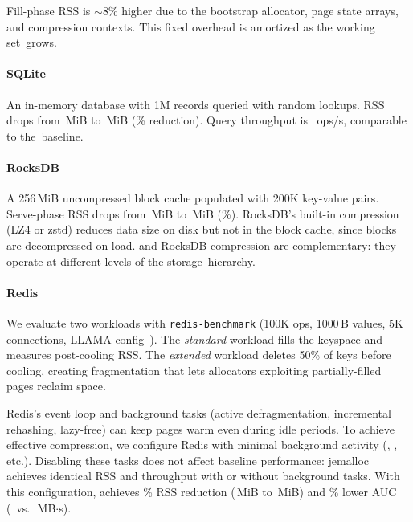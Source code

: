Fill-phase RSS is $\sim$8\% higher due to the
bootstrap allocator, page state arrays, and compression contexts.
This fixed overhead is amortized as the working set~grows.

\paragraph{SQLite}
An in-memory database with 1M records queried with random lookups.
RSS drops from \ablSqliteBaselineServeRss\,MiB to \ablSqliteDefaultServeRss\,MiB (\ablSqliteDefaultRssRedInt\% reduction).
Query throughput is \ablSqliteDefaultOps~ops/s, comparable to the~baseline.

\paragraph{RocksDB}
A 256\,MiB uncompressed block cache populated with 200K key-value
pairs.  Serve-phase RSS drops from \ablRocksdbBaselineServeRss\,MiB to \ablRocksdbDefaultServeRss\,MiB (\ablRocksdbDefaultRssRedInt\%).
RocksDB's built-in compression (LZ4 or zstd) reduces
data size on disk but not in the block cache, since blocks are
decompressed on load.  \sys and RocksDB compression are
complementary: they operate at different levels of the
storage~hierarchy.

\paragraph{Redis}
We evaluate two workloads with \texttt{redis-bench\-mark}
(100K ops, 1000\,B values, 5K connections, LLAMA
config~\cite{maas2020adaptive}).
The \emph{standard} workload fills the keyspace and measures
post-cooling RSS\@.  The \emph{extended} workload deletes
50\% of keys before cooling, creating fragmentation
that lets allocators exploiting partially-filled pages
reclaim space.

Redis's event loop and background tasks (active defragmentation,
incremental rehashing, lazy-free) can keep pages warm even during
idle periods.  To achieve effective compression, we configure Redis
with minimal background activity
(, , etc.).
Disabling these tasks does not affect baseline performance: jemalloc
achieves identical RSS and throughput with or without background tasks.
With this configuration, \sys achieves \ablRedisDefaultRssRedInt\% RSS reduction
(\ablRedisBaselineServeRss\,MiB to \ablRedisDefaultServeRss\,MiB) and
\aucRedisSmashRed\% lower AUC (\ablRedisDefaultAuc\ vs.\ \ablRedisBaselineAuc\,MB$\cdot$s).

